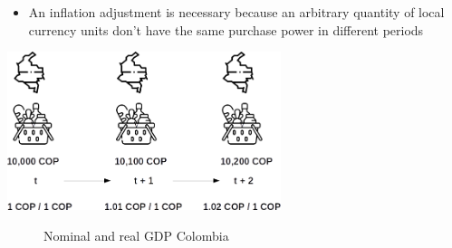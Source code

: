 \documentclass[
  ignorenonframetext,
]{beamer}
\providecommand{\tightlist}{%
  \setlength{\itemsep}{0pt}\setlength{\parskip}{0pt}}\usepackage{longtable,booktabs,array}
\begin{document}
\begin{frame}{}
\label{section-10}
\begin{itemize}
\tightlist
\item
  An inflation adjustment is necessary because an arbitrary quantity of
  local currency units don't have the same purchase power in different
  periods
\end{itemize}

\begin{center}
\includegraphics[width=0.6\textwidth,height=\textheight]{_000_images/002_image1.png}
\end{center}
\end{frame}

\begin{frame}{}
\label{section-11}
\begin{figure}


\caption{\label{fig-nominal-real-gdp-col}Nominal and real GDP Colombia}

\end{figure}%
\end{frame}
\end{document}
